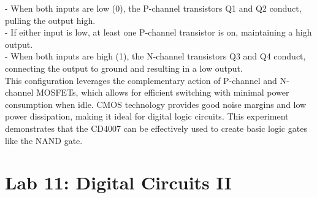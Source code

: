 \documentclass{article}
\begin{document}
       - When both inputs are low (0), the P-channel transistors Q1 and Q2 conduct, pulling the output high.
       \\
       - If either input is low, at least one P-channel transistor is on, maintaining a high output.
       \\
       - When both inputs are high (1), the N-channel transistors Q3 and Q4 conduct, connecting the output to ground and resulting in a low output.
       \\
    
    This configuration leverages the complementary action of P-channel and N-channel MOSFETs, which allows for efficient switching with minimal power consumption when idle. CMOS technology provides good noise margins and low power dissipation, making it ideal for digital logic circuits. This experiment demonstrates that the CD4007 can be effectively used to create basic logic gates like the NAND gate.

\section*{Lab 11: Digital Circuits II}
  
\end{document}
